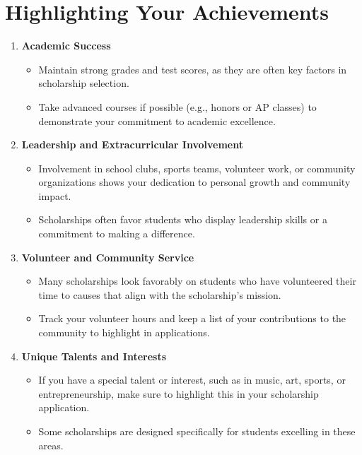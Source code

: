 \documentclass[
  letterpaper,
  DIV=11,
  numbers=noendperiod]{scrreprt}
\providecommand{\tightlist}{%
  \setlength{\itemsep}{0pt}\setlength{\parskip}{0pt}}\usepackage{longtable,booktabs,array}
\begin{document}
\section{Highlighting Your
Achievements}\label{highlighting-your-achievements}

\begin{enumerate}
\def\labelenumi{\arabic{enumi}.}
\item
  \textbf{Academic Success}

  \begin{itemize}
  \tightlist
  \item
    Maintain strong grades and test scores, as they are often key
    factors in scholarship selection.
  \item
    Take advanced courses if possible (e.g., honors or AP classes) to
    demonstrate your commitment to academic excellence.
  \end{itemize}
\item
  \textbf{Leadership and Extracurricular Involvement}

  \begin{itemize}
  \tightlist
  \item
    Involvement in school clubs, sports teams, volunteer work, or
    community organizations shows your dedication to personal growth and
    community impact.
  \item
    Scholarships often favor students who display leadership skills or a
    commitment to making a difference.
  \end{itemize}
\item
  \textbf{Volunteer and Community Service}

  \begin{itemize}
  \tightlist
  \item
    Many scholarships look favorably on students who have volunteered
    their time to causes that align with the scholarship's mission.
  \item
    Track your volunteer hours and keep a list of your contributions to
    the community to highlight in applications.
  \end{itemize}
\item
  \textbf{Unique Talents and Interests}

  \begin{itemize}
  \tightlist
  \item
    If you have a special talent or interest, such as in music, art,
    sports, or entrepreneurship, make sure to highlight this in your
    scholarship application.
  \item
    Some scholarships are designed specifically for students excelling
    in these areas.
  \end{itemize}
\end{enumerate}
\end{document}
